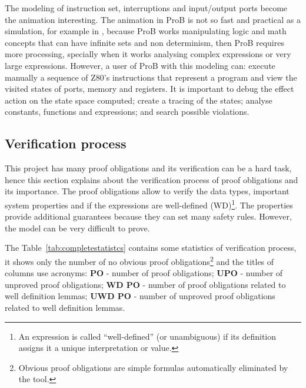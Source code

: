 \documentclass[a4paper]{llncs}
\begin{document}
The modeling of instruction set, interruptions and input/output ports become the
animation interesting. The animation in ProB is not so fast and practical as a
simulation, for example in \cite{Simulator_z80}, because ProB works manipulating
logic and math concepts that can have infinite sets and non determinism, then
ProB requires more processing, specially when it works analysing  complex
expressions or very large expressions. However, a user of ProB with this
modeling can: execute manually a sequence of Z80's instructions that represent a
program and view the visited states of ports, memory and registers. It is
important to debug the effect action on the state space computed; create a
tracing of the states; analyse constants, functions and expressions; and search
possible violations.

\subsection{Verification process}%
This project has many proof obligations and its verification can be a hard task,
hence this section explains about the verification process of proof
obligations and its importance. %
The proof obligations allow to verify the data types, important system properties and if
the expressions are well-defined (WD)\footnote{An expression is called ``well-defined''
(or unambiguous) if its definition assigns it a unique interpretation or value.}. The
properties provide additional guarantees because they can set many safety
rules. However, the model can be very difficult to prove.


The Table~\ref{tab:completestatistcs} contains some statistics of verification
process, it shows only the number of no obvious proof
obligations\footnote{Obvious proof obligations are simple formulas automatically eliminated by
the tool.} and the titles of columns use acronyms: {\small \textbf{PO}} - number
of proof obligations; {\small \textbf{UPO}} - number of unproved proof
obligations; {\small \textbf{WD PO}} - number of proof obligations  related to
well definition lemmas; {\small \textbf{UWD PO}} - number of unproved proof
obligations related to well definition lemmas.
 
\end{document}
